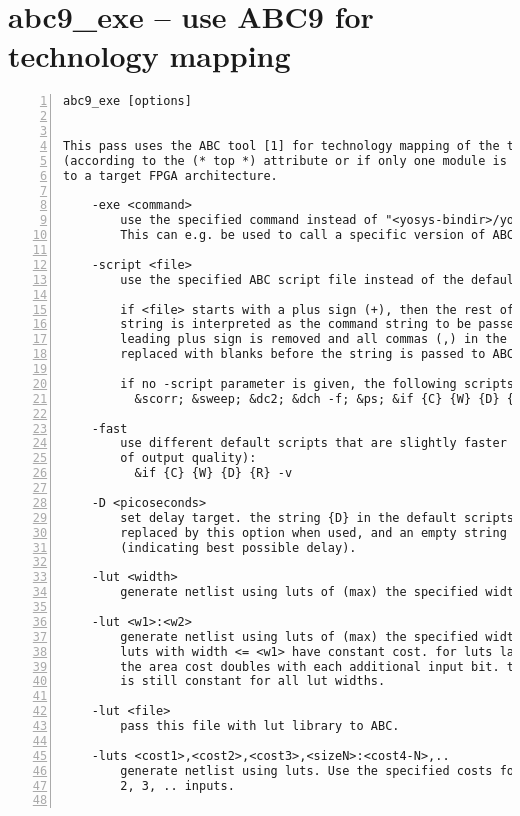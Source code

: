 \section{abc9\_exe -- use ABC9 for technology mapping}
\label{cmd:abc9_exe}
\begin{lstlisting}[numbers=left,frame=single]
    abc9_exe [options]

 
This pass uses the ABC tool [1] for technology mapping of the top module
(according to the (* top *) attribute or if only one module is currently selected)
to a target FPGA architecture.

    -exe <command>
        use the specified command instead of "<yosys-bindir>/yosys-abc" to execute ABC.
        This can e.g. be used to call a specific version of ABC or a wrapper.

    -script <file>
        use the specified ABC script file instead of the default script.

        if <file> starts with a plus sign (+), then the rest of the filename
        string is interpreted as the command string to be passed to ABC. The
        leading plus sign is removed and all commas (,) in the string are
        replaced with blanks before the string is passed to ABC.

        if no -script parameter is given, the following scripts are used:
          &scorr; &sweep; &dc2; &dch -f; &ps; &if {C} {W} {D} {R} -v; &mfs

    -fast
        use different default scripts that are slightly faster (at the cost
        of output quality):
          &if {C} {W} {D} {R} -v

    -D <picoseconds>
        set delay target. the string {D} in the default scripts above is
        replaced by this option when used, and an empty string otherwise
        (indicating best possible delay).

    -lut <width>
        generate netlist using luts of (max) the specified width.

    -lut <w1>:<w2>
        generate netlist using luts of (max) the specified width <w2>. All
        luts with width <= <w1> have constant cost. for luts larger than <w1>
        the area cost doubles with each additional input bit. the delay cost
        is still constant for all lut widths.

    -lut <file>
        pass this file with lut library to ABC.

    -luts <cost1>,<cost2>,<cost3>,<sizeN>:<cost4-N>,..
        generate netlist using luts. Use the specified costs for luts with 1,
        2, 3, .. inputs.


\end{lstlisting}
